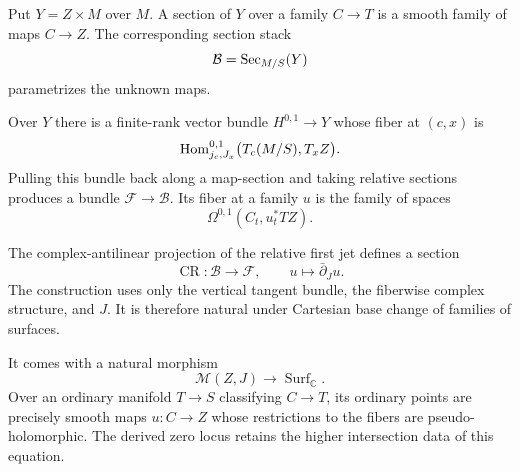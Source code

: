 Put $Y=Z\times M$ over $M$. A section of $Y$ over a family $C\to T$ is a
smooth family of maps $C\to Z$. The corresponding section stack
\[
  \mathcal B
  =\operatorname{Sec}_{M/S}(Y)
\]
parametrizes the unknown maps.

Over $Y$ there is a finite-rank vector bundle $H^{0,1}\to Y$ whose fiber at
$(c,x)$ is
\[
  \operatorname{Hom}^{0,1}_{j_c,J_x}
  \bigl(T_c(M/S),T_xZ\bigr).
\]
Pulling this bundle back along a map-section and taking relative sections
produces a bundle $\mathcal F\to\mathcal B$. Its fiber at a family $u$ is the
family of spaces
\[
  \Omega^{0,1}(C_t,u_t^*TZ).
\]

The complex-antilinear projection of the relative first jet defines a section
\[
  \operatorname{CR}\colon\mathcal B\longrightarrow\mathcal F,
  \qquad
  u\longmapsto\bar\partial_Ju.
\]
The construction uses only the vertical tangent bundle, the fiberwise complex
structure, and $J$. It is therefore natural under Cartesian base change of
families of surfaces.


It comes with a natural morphism
\[
  \mathcal M(Z,J)
  \longrightarrow
  \operatorname{Surf}_{\mathbb C}.
\]
Over an ordinary manifold $T\to S$ classifying $C\to T$, its ordinary
points are precisely smooth maps $u\colon C\to Z$ whose restrictions to the
fibers are pseudo-holomorphic. The derived zero locus retains the higher
intersection data of this equation.


